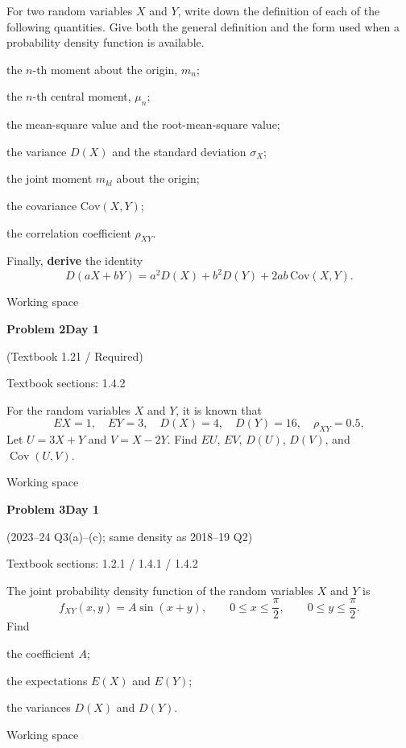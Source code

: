 \documentclass[11pt]{article}
\newcommand{\qtitle}[2]{\clearpage\begin{tcolorbox}[colback=navy,colframe=navy,arc=1.5pt,boxrule=0pt]\color{white}\large\bfseries #1\hfill\small #2\end{tcolorbox}}
\begin{document}
\begin{tcolorbox}[colback=qbg,colframe=qbg,boxrule=0pt]For two random variables $X$ and $Y$, write down the definition of each of the following
quantities. Give both the general definition and the form used when a probability density
function is available.
\begin{qparts}
  \item the $n$-th moment about the origin, $m_n$;
  \item the $n$-th central moment, $\mu_n$;
  \item the mean-square value and the root-mean-square value;
  \item the variance $D(X)$ and the standard deviation $\sigma_X$;
  \item the joint moment $m_{kl}$ about the origin;
  \item the covariance $\mathrm{Cov}(X,Y)$;
  \item the correlation coefficient $\rho_{XY}$.
\end{qparts}
Finally, \textbf{derive} the identity
\[
D(aX+bY)=a^{2}D(X)+b^{2}D(Y)+2ab\,\mathrm{Cov}(X,Y).
\]\end{tcolorbox}\smallskip\begin{workspace}\hfill{\color{linec}\footnotesize Working space}\end{workspace}
\qtitle{Problem 2}{Day 1}
{\small\color{accentred}(Textbook 1.21 / Required)}\par\smallskip
{\small\color{muted}Textbook sections: 1.4.2}\par\medskip
\begin{tcolorbox}[colback=qbg,colframe=qbg,boxrule=0pt]For the random variables $X$ and $Y$, it is known that
\[
EX=1,\quad EY=3,\quad D(X)=4,\quad D(Y)=16,\quad \rho_{XY}=0.5,
\]
Let $U=3X+Y$ and $V=X-2Y$. Find $EU$, $EV$, $D(U)$, $D(V)$, and $\operatorname{Cov}(U,V)$.\end{tcolorbox}\smallskip\begin{workspace}\hfill{\color{linec}\footnotesize Working space}\end{workspace}
\qtitle{Problem 3}{Day 1}
{\small\color{accentred}(2023--24 Q3(a)--(c); same density as 2018--19 Q2)}\par\smallskip
{\small\color{muted}Textbook sections: 1.2.1 / 1.4.1 / 1.4.2}\par\medskip
\begin{tcolorbox}[colback=qbg,colframe=qbg,boxrule=0pt]The joint probability density function of the random variables $X$ and $Y$ is
\[
f_{XY}(x,y)=A\sin(x+y),\qquad 0\le x\le \frac{\pi}{2},\qquad 0\le y\le \frac{\pi}{2}.
\]
Find
\begin{qparts}
  \item the coefficient $A$;
  \item the expectations $E(X)$ and $E(Y)$;
  \item the variances $D(X)$ and $D(Y)$.
\end{qparts}\end{tcolorbox}\smallskip\begin{workspace}\hfill{\color{linec}\footnotesize Working space}\end{workspace}
\end{document}
